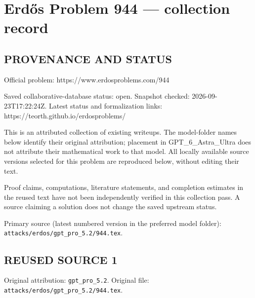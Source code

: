 \section*{Erd\H{o}s Problem 944 --- collection record}

\subsection*{PROVENANCE AND STATUS}
Official problem: https://www.erdosproblems.com/944

Saved collaborative-database status: open.
Snapshot checked: 2026-09-23T17:22:24Z.
Latest status and formalization links: https://teorth.github.io/erdosproblems/

This is an attributed collection of existing writeups. The model-folder names below identify their original attribution; placement in GPT\_6\_Astra\_Ultra does not attribute their mathematical work to that model. All locally available source versions selected for this problem are reproduced below, without editing their text.

Proof claims, computations, literature statements, and completion estimates in the reused text have not been independently verified in this collection pass. A source claiming a solution does not change the saved upstream status.

Primary source (latest numbered version in the preferred model folder): \texttt{attacks/erdos/gpt\_pro\_5.2/944.tex}.

\subsection*{REUSED SOURCE 1}
Original attribution: \texttt{gpt\_pro\_5.2}.
Original file: \texttt{attacks/erdos/gpt\_pro\_5.2/944.tex}.


